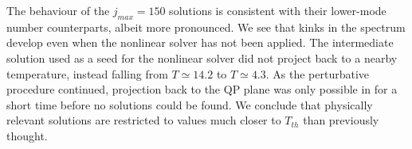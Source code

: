 \documentclass[../PhD.tex]{subfiles}
\begin{document}
\begin{subappendices}
The behaviour of the $j_{max}=150$ solutions is consistent with their lower-mode number counterparts, albeit more pronounced. We see that kinks in the spectrum develop even when the nonlinear solver has not been applied. The intermediate solution used as a seed for the nonlinear solver did not project back to a nearby temperature, instead falling from $T \simeq 14.2$ to $T \simeq 4.3$. As the perturbative procedure continued, projection back to the QP plane was only possible in for a short time before no solutions could be found. We conclude that physically relevant solutions are restricted to values much closer to $T_{th}$ than previously thought.

\end{subappendices}

\end{document}
